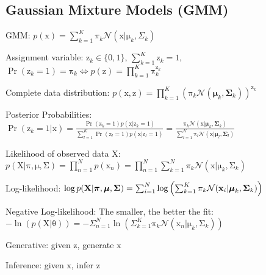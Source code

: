 \documentclass[a4paper, 11pt, landscape]{article}
\newcommand{\matr}[1]{\boldsymbol{\mathrm{#1}}}
\begin{document}
\begin{multicols*}{3}
\section{Gaussian Mixture Models (GMM)}
\begin{compactdesc}
	\item[GMM:] $p(\matr{x}) = \sum_{k=1}^K \pi_k \mathcal{N}(\matr{x} | \matr{\mu}_k, \Sigma_k)$
	\item[Assignment variable:] $\matr{z}_k \in \{0, 1\}$, $\sum_{k=1}^K \matr{z}_k = 1$, $\operatorname{Pr}(\matr{z}_k = 1) = \matr{\pi}_k \Leftrightarrow p(\matr{z}) = \prod_{k=1}^K \matr{\pi}_k^{\matr{z}_k}$
	\item[Complete data distribution:] $p(\matr{x}, \matr{z}) = \prod_{k=1}^K \left( \matr{\pi}_k \mathcal{N}(\boldsymbol{\mu}_k, \boldsymbol{\Sigma}_k) \right)^{\matr{z}_k}$
	\item[Posterior Probabilities:] $\operatorname{Pr}(\matr{z}_k = 1 | \matr{x}) = \frac{\operatorname{Pr}(\matr{z}_k = 1) p(\matr{x} | \matr{z}_k = 1)}{\sum_{l=1}^K \operatorname{Pr}(\matr{z}_l = 1) p(\matr{x} | \matr{z}_l = 1)} = \frac{\matr{\pi}_k \mathcal{N}(\matr{x} | \boldsymbol{\mu}_k, \boldsymbol{\Sigma}_k)}{\sum_{l=1}^K \matr{\pi}_l \mathcal{N}(\matr{x} | \boldsymbol{\mu}_l, \boldsymbol{\Sigma}_l)}$
	\item[Likelihood of observed data $\matr{X}$:] $p(\matr{X} | \matr{\pi}, \matr{\mu}, \matr{\Sigma}) = \prod_{n=1}^N p(\matr{x}_n) = \prod_{n=1}^N \sum_{k=1}^N \pi_k \mathcal{N}(\matr{x} | \matr{\mu}_k, \matr{\Sigma}_k)$
	\item[Log-likelihood:] $\log p(\matr{X} | \matr{\pi}, \matr{\mu}, \matr{\Sigma}) =\break \sum_{i=1}^N \log \left( \sum_{k=1}^K \pi_k \mathcal{N}(\matr{x}_i | \matr{\mu}_k, \matr{\Sigma}_k) \right)$
	\item[Negative Log-likelihood:] The smaller, the better the fit: $-\ln(p(\matr{X} | \matr{\theta})) = -\Sigma_{n=1}^N \ln\left( \Sigma_{k=1}^K \matr{\pi}_k \mathcal{N}(\matr{x}_n | \matr{\mu}_k, \matr{\Sigma}_k) \right)$
\end{compactdesc}
\begin{compactitem}
	\item Generative: given $\matr{z}$, generate $\matr{x}$
	\item Inference: given $\matr{x}$, infer $\matr{z}$
\end{compactitem}



\end{multicols*}
\end{document}
